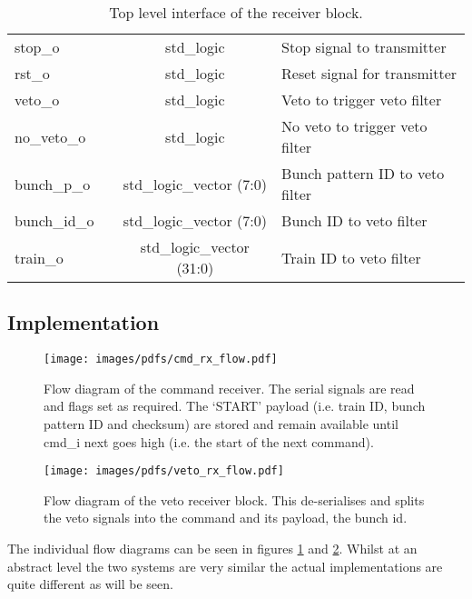 \documentclass[]{article}
\begin{document}
\begin{table}
\begin{center}
\begin{tabulary}{\textwidth}{l|c|c|L}
        stop\_o      &  & std\_logic                & Stop signal to transmitter      \\
        rst\_o       &  & std\_logic                & Reset signal for transmitter    \\
        veto\_o      &  & std\_logic                & Veto to trigger veto filter     \\
        no\_veto\_o  &  & std\_logic                & No veto to trigger veto filter  \\
        bunch\_p\_o  &  & std\_logic\_vector (7:0)  & Bunch pattern ID to veto filter \\
        bunch\_id\_o &  & std\_logic\_vector (7:0)  & Bunch ID to veto filter         \\
        train\_o     &  & std\_logic\_vector (31:0) & Train ID to veto filter         \\
      \end{tabulary}
    \end{center}
    \caption{Top level interface of the receiver block.}
    \label{tab:rx_interface}
  \end{table}
  \subsection{Implementation} %
  \label{sub:rx_implementation}

  \begin{figure}[htbp]
    \centering
    \texttt{[image: images/pdfs/cmd\_rx\_flow.pdf]}
    \caption{Flow diagram of the command receiver. The serial signals are read and flags set as required. The `START' payload (i.e. train ID, bunch pattern ID and checksum) are stored and remain available until cmd\_i next goes high (i.e. the start of the next command).}
    \label{fig:cmd_rx_flow}
  \end{figure}
  \begin{figure}[htbp]
    \centering
    \texttt{[image: images/pdfs/veto\_rx\_flow.pdf]}
    \caption{Flow diagram of the veto receiver block. This de-serialises and splits the veto signals into the command and its payload, the bunch id.}
    \label{fig:veto_rx_flow}
  \end{figure}

  The individual flow diagrams can be seen in figures \ref{fig:cmd_rx_flow} and \ref{fig:veto_rx_flow}. Whilst at an abstract level the two systems are very similar the actual implementations are quite different as will be seen.
  
\end{document}
